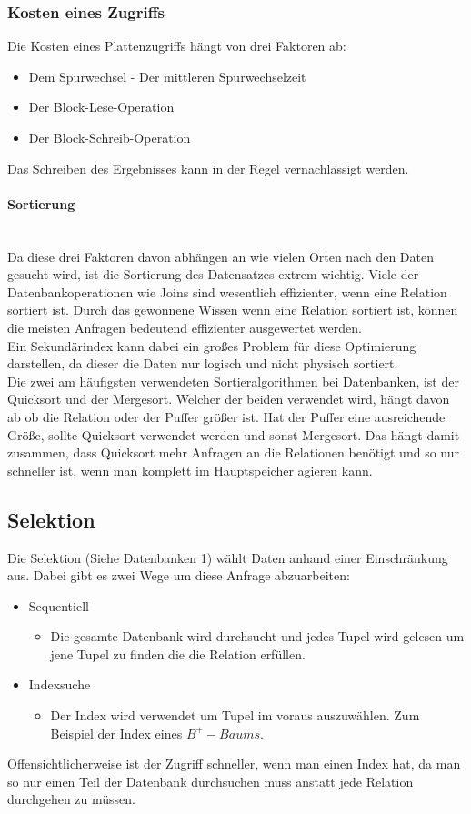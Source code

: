 \documentclass{article}
\newcommand{\paragraphlb}[1]{\paragraph{#1}\mbox{}\\}
\begin{document}
	\subsubsection{Kosten eines Zugriffs}
	Die Kosten eines Plattenzugriffs hängt von drei Faktoren ab:
	\begin{itemize}
		\item{Dem Spurwechsel - Der mittleren Spurwechselzeit}
		\item{Der Block-Lese-Operation}
		\item{Der Block-Schreib-Operation}
	\end{itemize}
	Das Schreiben des Ergebnisses kann in der Regel vernachlässigt werden.
	\paragraphlb{Sortierung}
	Da diese drei Faktoren davon abhängen an wie vielen Orten nach den Daten gesucht wird, ist die Sortierung des Datensatzes extrem wichtig. Viele der Datenbankoperationen wie Joins sind wesentlich effizienter, wenn eine Relation sortiert ist. Durch das gewonnene Wissen wenn eine Relation sortiert ist, können die meisten Anfragen bedeutend effizienter ausgewertet werden. \\
	Ein Sekundärindex kann dabei ein großes Problem für diese Optimierung darstellen, da dieser die Daten nur logisch und nicht physisch sortiert. \\
	Die zwei am häufigsten verwendeten Sortieralgorithmen bei Datenbanken, ist der Quicksort und der Mergesort. Welcher der beiden verwendet wird, hängt davon ab ob die Relation oder der Puffer größer ist. Hat der Puffer eine ausreichende Größe, sollte Quicksort verwendet werden und sonst Mergesort. Das hängt damit zusammen, dass Quicksort mehr Anfragen an die Relationen benötigt und so nur schneller ist, wenn man komplett im Hauptspeicher agieren kann.
	\subsection{Selektion}
	Die Selektion (Siehe Datenbanken 1) wählt Daten anhand einer Einschränkung aus. Dabei gibt es zwei Wege um diese Anfrage abzuarbeiten:
	\begin{itemize}
		\item{Sequentiell}
		\begin{itemize}
			\item{Die gesamte Datenbank wird durchsucht und jedes Tupel wird gelesen um jene Tupel zu finden die die Relation erfüllen.}
		\end{itemize}
		\item{Indexsuche}
		\begin{itemize}
			\item{Der Index wird verwendet um Tupel im voraus auszuwählen. Zum Beispiel der Index eines $B^+-Baums$.}
		\end{itemize}
	\end{itemize}
	Offensichtlicherweise ist der Zugriff schneller, wenn man einen Index hat, da man so nur einen Teil der Datenbank durchsuchen muss anstatt jede Relation durchgehen zu müssen.
\end{document}

